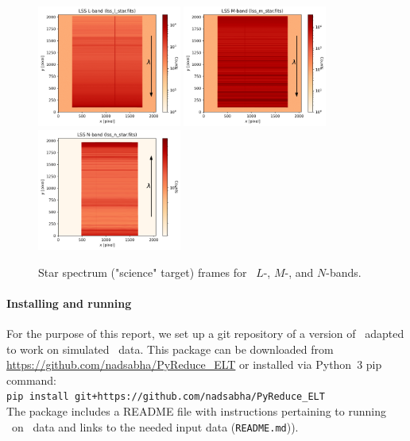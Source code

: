 \begin{figure}[!h]
\centering
  \includegraphics[height=4cm,keepaspectratio]{figures/LSS_CrtAlg_files/lss_l_star.fits.png}
  \includegraphics[height=4cm,keepaspectratio]{figures/LSS_CrtAlg_files/lss_m_star.fits.png}
  \includegraphics[height=4cm,keepaspectratio]{figures/LSS_CrtAlg_files/lss_n_star.fits.png}
  \caption{Star spectrum ("science" target) frames for \lss~$L$-, $M$-, and $N$-bands.} 
  \label{fig:star}
\end{figure}

\paragraph{Installing and running \pyred}\label{sec:pryred_install}

For the purpose of this report, we set up a git repository of a version of \pyred~adapted to work on simulated \met~data. This package can be downloaded from \url{https://github.com/nadsabha/PyReduce_ELT} or installed via Python~3 pip command: \\
\texttt{pip install git+https://github.com/nadsabha/PyReduce\_ELT} \\
The package includes a README file with instructions pertaining to running \pyred~on \elt~data and links to the needed input data (\texttt{README.md})).


